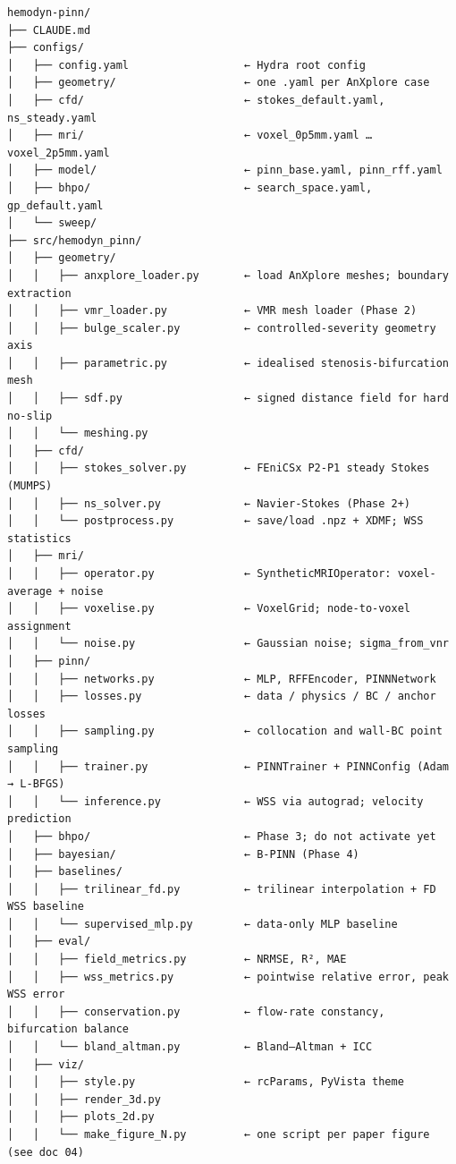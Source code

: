 \documentclass[
]{article}
\begin{document}
\begin{verbatim}
hemodyn-pinn/
├── CLAUDE.md
├── configs/
│   ├── config.yaml                  ← Hydra root config
│   ├── geometry/                    ← one .yaml per AnXplore case
│   ├── cfd/                         ← stokes_default.yaml, ns_steady.yaml
│   ├── mri/                         ← voxel_0p5mm.yaml … voxel_2p5mm.yaml
│   ├── model/                       ← pinn_base.yaml, pinn_rff.yaml
│   ├── bhpo/                        ← search_space.yaml, gp_default.yaml
│   └── sweep/
├── src/hemodyn_pinn/
│   ├── geometry/
│   │   ├── anxplore_loader.py       ← load AnXplore meshes; boundary extraction
│   │   ├── vmr_loader.py            ← VMR mesh loader (Phase 2)
│   │   ├── bulge_scaler.py          ← controlled-severity geometry axis
│   │   ├── parametric.py            ← idealised stenosis-bifurcation mesh
│   │   ├── sdf.py                   ← signed distance field for hard no-slip
│   │   └── meshing.py
│   ├── cfd/
│   │   ├── stokes_solver.py         ← FEniCSx P2-P1 steady Stokes (MUMPS)
│   │   ├── ns_solver.py             ← Navier-Stokes (Phase 2+)
│   │   └── postprocess.py           ← save/load .npz + XDMF; WSS statistics
│   ├── mri/
│   │   ├── operator.py              ← SyntheticMRIOperator: voxel-average + noise
│   │   ├── voxelise.py              ← VoxelGrid; node-to-voxel assignment
│   │   └── noise.py                 ← Gaussian noise; sigma_from_vnr
│   ├── pinn/
│   │   ├── networks.py              ← MLP, RFFEncoder, PINNNetwork
│   │   ├── losses.py                ← data / physics / BC / anchor losses
│   │   ├── sampling.py              ← collocation and wall-BC point sampling
│   │   ├── trainer.py               ← PINNTrainer + PINNConfig (Adam → L-BFGS)
│   │   └── inference.py             ← WSS via autograd; velocity prediction
│   ├── bhpo/                        ← Phase 3; do not activate yet
│   ├── bayesian/                    ← B-PINN (Phase 4)
│   ├── baselines/
│   │   ├── trilinear_fd.py          ← trilinear interpolation + FD WSS baseline
│   │   └── supervised_mlp.py        ← data-only MLP baseline
│   ├── eval/
│   │   ├── field_metrics.py         ← NRMSE, R², MAE
│   │   ├── wss_metrics.py           ← pointwise relative error, peak WSS error
│   │   ├── conservation.py          ← flow-rate constancy, bifurcation balance
│   │   └── bland_altman.py          ← Bland–Altman + ICC
│   ├── viz/
│   │   ├── style.py                 ← rcParams, PyVista theme
│   │   ├── render_3d.py
│   │   ├── plots_2d.py
│   │   └── make_figure_N.py         ← one script per paper figure (see doc 04)

\end{verbatim}
\end{document}

